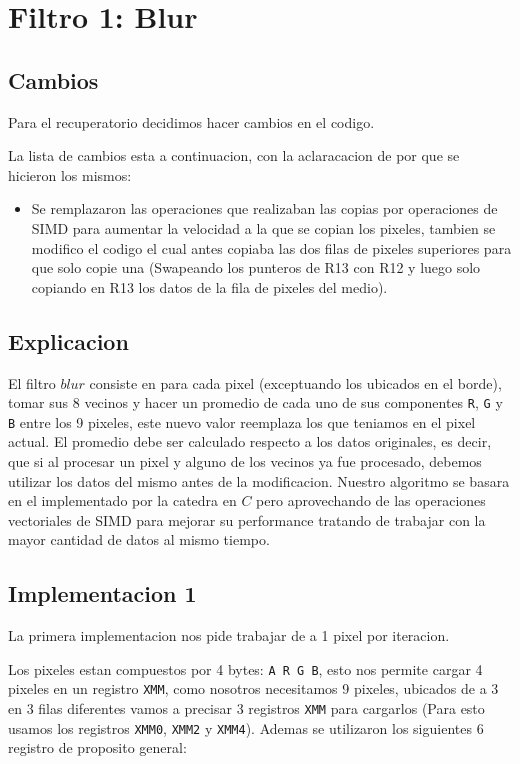 \section{Filtro 1: Blur}

\subsection{Cambios}
Para el recuperatorio decidimos hacer cambios en el codigo.

La lista de cambios esta a continuacion, con la aclaracacion de por que se hicieron los mismos:
\noindent
\begin{itemize}
\item Se remplazaron las operaciones que realizaban las copias por operaciones de SIMD para aumentar la velocidad a la que se copian los pixeles, tambien se modifico el codigo el cual antes copiaba las dos filas de pixeles superiores para que solo copie una (Swapeando los punteros de R13 con R12 y luego solo copiando en R13 los datos de la fila de pixeles del medio).
\end{itemize}

\subsection{Explicacion}

El filtro $blur$ consiste en para cada pixel (exceptuando los ubicados en el borde), tomar sus 8 vecinos y hacer un promedio de cada uno de sus componentes \texttt{R}, \texttt{G} y \texttt{B} entre los 9 pixeles, este nuevo valor reemplaza los que teniamos en el pixel actual. El promedio debe ser calculado respecto a los datos originales, es decir, que si al procesar un pixel y alguno de los vecinos ya fue procesado, debemos utilizar los datos del mismo antes de la modificacion. Nuestro algoritmo se basara en el implementado por la catedra en $C$ pero aprovechando de las operaciones vectoriales de SIMD para mejorar su performance tratando de trabajar con la mayor cantidad de datos al mismo tiempo.

\subsection{Implementacion 1}
La primera implementacion nos pide trabajar de a 1 pixel por iteracion.

Los pixeles estan compuestos por 4 bytes: \texttt{A R G B}, esto nos permite cargar 4 pixeles en un registro \texttt{XMM}, como nosotros necesitamos 9 pixeles, ubicados de a 3 en 3 filas diferentes vamos a precisar 3 registros \texttt{XMM} para cargarlos (Para esto usamos los registros \texttt{XMM0}, \texttt{XMM2} y \texttt{XMM4}). Ademas se utilizaron los siguientes 6 registro de proposito general: \\

